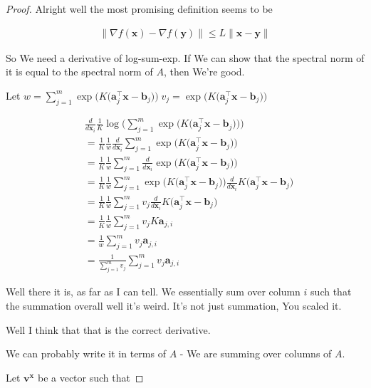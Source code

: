 \documentclass{article}
\begin{document}
\begin{proof}
	Alright well the most promising definition seems to be
	
	\begin{align}
		\|\nabla f(\mathbf{x}) - \nabla f(\mathbf{y})\| \le L\|\mathbf{x}-\mathbf{y}\|
	\end{align}
	
	So We need a derivative of log-sum-exp. If We can show that the spectral norm of it is equal to the spectral norm of $A$, then We're good. 
	
	Let $w = \sum^m_{j=1}\exp\big(K\big( \mathbf{a}_j^\top\mathbf{x} - \mathbf{b}_j\big) \big)\;v_j=\exp\big(K\big( \mathbf{a}_j^\top\mathbf{x} - \mathbf{b}_j\big) \big)$
	
	\begin{align}
		&\frac{d}{d\mathbf{x}_i}  \frac{1}{K}\log\bigg( \sum^m_{j=1}\exp\big(K\big( \mathbf{a}_j^\top\mathbf{x} - \mathbf{b}_j\big) \big) \bigg)\\
		&= \frac{1}{K} \frac{1}{w}\frac{d}{d\mathbf{x}_i} \sum^m_{j=1}\exp\big(K\big( \mathbf{a}_j^\top\mathbf{x} - \mathbf{b}_j\big) \big)\\
		&= \frac{1}{K} \frac{1}{w} \sum^m_{j=1} \frac{d}{d\mathbf{x}_i} \exp\big(K\big( \mathbf{a}_j^\top\mathbf{x} - \mathbf{b}_j\big) \big)\\
		&= \frac{1}{K} \frac{1}{w} \sum^m_{j=1}  \exp\big(K\big( \mathbf{a}_j^\top\mathbf{x} - \mathbf{b}_j\big) \big)\frac{d}{d\mathbf{x}_i} K\big( \mathbf{a}_j^\top\mathbf{x} - \mathbf{b}_j\big)\\
	&= \frac{1}{K} \frac{1}{w} \sum^m_{j=1} v_j \frac{d}{d\mathbf{x}_i}K\big( \mathbf{a}_j^\top\mathbf{x} - \mathbf{b}_j\big)\\
	&= \frac{1}{K} \frac{1}{w} \sum^m_{j=1} v_j K\mathbf{a}_{j,i}\\
	&=  \frac{1}{w} \sum^m_{j=1} v_j \mathbf{a}_{j,i}\\
	&=  \frac{1}{\sum^m_{j=1} v_j} \sum^m_{j=1} v_j \mathbf{a}_{j,i}
	\end{align}
	
	Well there it is, as far as I can tell. We essentially sum over column $i$ such that the summation overall well it's weird. It's not just summation, You scaled it. 
	
	Well I think that that is the correct derivative. 
	
	We can probably write it in terms of $A$ - We are summing over columns of $A$.
	
	Let $\mathbf{v}^\mathbf{x}$ be a vector such that 
	

\end{proof}
\end{document}
